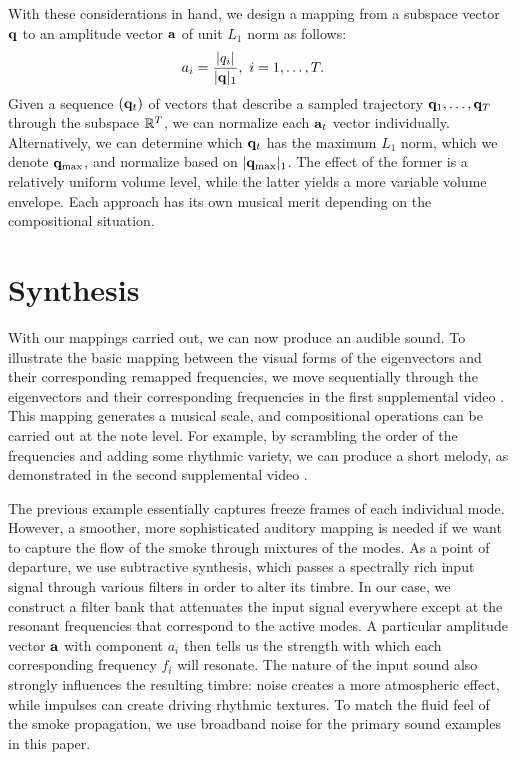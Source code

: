 With these considerations in hand, we design a mapping from a subspace vector $\mathbf{q}$ to an amplitude vector $\mathbf{a}$ of unit $L_1$ norm as follows:
\begin{equation}
\begin{aligned}
a_i &= \frac{\lvert q_i \rvert}{\lvert\mathbf{q}\rvert_1}, \ i = 1, \ldots, T.
\end{aligned}
\end{equation}
Given a sequence $(\mathbf{q}_t)$ of vectors that describe a sampled trajectory $\mathbf{q}_1, \ldots, \mathbf{q}_T$ through the subspace $\mathbb{R}^T$, we can normalize each $\mathbf{a}_t$ vector individually. Alternatively, we can determine which $\mathbf{q}_t$ has the maximum $L_1$ norm, which we denote ${\mathbf{q}}_\textnormal{max}$, and normalize based on $\lvert\mathbf{q}_{\textnormal{max}}\rvert_1$. The effect of the former is a relatively uniform volume level, while the latter yields a more variable volume envelope. Each approach has its own musical merit depending on the compositional situation.

\section*{Synthesis}

With our mappings carried out, we can now produce an audible sound. To illustrate the basic mapping between the visual forms of the eigenvectors and their corresponding remapped frequencies, we move sequentially through the eigenvectors and their corresponding frequencies in the first supplemental video \cite{sequential}. This mapping generates a musical scale, and compositional operations can be carried out at the note level. For example, by scrambling the order of the frequencies and adding some rhythmic variety, we can produce a short melody, as demonstrated in the second supplemental video \cite{melody}.


The previous example essentially captures freeze frames of each individual mode. However, a smoother, more sophisticated auditory mapping is needed if we want to capture the flow of the smoke through mixtures of the modes. As a point of departure, we use subtractive synthesis, which passes a spectrally rich input signal through various filters in order to alter its timbre. In our case, we construct a filter bank that attenuates the input signal everywhere except at the resonant frequencies that correspond to the active modes. A particular amplitude vector $\mathbf{a}$ with component $a_i$ then tells us the strength with which each corresponding frequency $f_i$ will resonate. The nature of the input sound also strongly influences the resulting timbre: noise creates a more atmospheric effect, while impulses can create driving rhythmic textures. To match the fluid feel of the smoke propagation, we use broadband noise for the primary sound examples in this paper.


